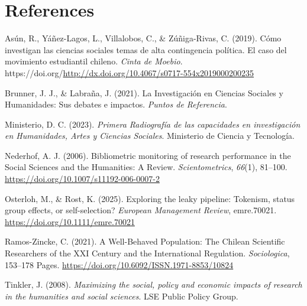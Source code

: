 \documentclass[
  12pt,
  letterpaper,
]{article}
\newlength{\cslhangindent}
\newenvironment{CSLReferences}[2] %
 {\begin{list}{}{%
  \setlength{\itemindent}{0pt}
  \setlength{\leftmargin}{0pt}
  \setlength{\parsep}{0pt}
  \ifodd #1
   \setlength{\leftmargin}{\cslhangindent}
   \setlength{\itemindent}{-1\cslhangindent}
  \fi
  \setlength{\itemsep}{#2\baselineskip}}}
 {\end{list}}
\begin{document}
\section{References}\label{references}

\label{refs}
\begin{CSLReferences}{1}{0}
Asún, R., Yáñez-Lagos, L., Villalobos, C., \& Zúñiga-Rivas, C. (2019).
Cómo investigan las ciencias sociales temas de alta contingencia
política. {El} caso del movimiento estudiantil chileno. \emph{Cinta de
Moebio}.
https://doi.org/\url{http://dx.doi.org/10.4067/s0717-554x2019000200235}

Brunner, J. J., \& Labraña, J. (2021). La {Investigación} en {Ciencias
Sociales} y {Humanidades}: {Sus} debates e impactos. \emph{Puntos de
Referencia}.

Ministerio, D. C. (2023). \emph{Primera {Radiografía} de las capacidades
en investigación en {Humanidades}, {Artes} y {Ciencias Sociales}}.
Ministerio de Ciencia y Tecnología.

Nederhof, A. J. (2006). Bibliometric monitoring of research performance
in the {Social Sciences} and the {Humanities}: {A Review}.
\emph{Scientometrics}, \emph{66}(1), 81--100.
\url{https://doi.org/10.1007/s11192-006-0007-2}

Osterloh, M., \& Rost, K. (2025). Exploring the leaky pipeline:
{Tokenism}, status group effects, or self-selection? \emph{European
Management Review}, emre.70021. \url{https://doi.org/10.1111/emre.70021}

Ramos-Zincke, C. (2021). A {Well-Behaved Population}: {The Chilean
Scientific Researchers} of the {XXI Century} and the {International
Regulation}. \emph{Sociologica}, 153--178 Pages.
\url{https://doi.org/10.6092/ISSN.1971-8853/10824}

Tinkler, J. (2008). \emph{Maximizing the social, policy and economic
impacts of research in the humanities and social sciences}. LSE Public
Policy Group.

\end{CSLReferences}
\end{document}
